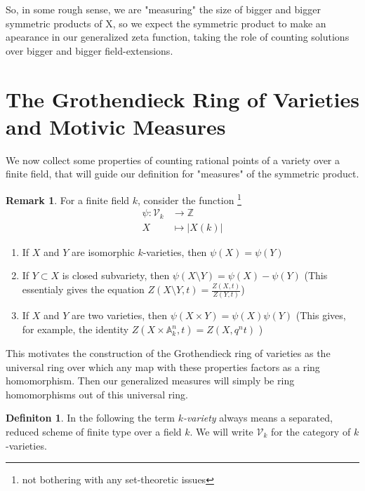 \documentclass[11pt, a4paper, german]{article}
\theoremstyle{plain}
\theoremstyle{definition}
\newtheorem{definition}[theorem]{Definiton}
\newtheorem{remark}[theorem]{Remark}
\begin{document}
So, in some rough sense, we are "measuring" the size of bigger and bigger symmetric products of X, so we expect the symmetric product
to make an apearance in our generalized zeta function, taking the role of counting solutions over bigger and bigger field-extensions.


\section{The Grothendieck Ring of Varieties and Motivic Measures}

We now collect some properties of counting rational points of a variety over a finite field, that will guide our definition for "measures" 
of the symmetric product.

\begin{remark}
    For a finite field $k$, consider the function \footnote{not bothering with any set-theoretic issues} 
    \begin{align*}
        \psi: \mathcal{V}_k & \to   \mathbb{Z}\\
        X & \mapsto |X(k)|
    \end{align*}
    \begin{enumerate}
        \item If $X$ and $Y$ are isomorphic $k$-varieties, then $\psi(X) = \psi(Y)$
        \item If $Y \subset X$ is closed subvariety, then $\psi(X \setminus Y) = \psi(X) - \psi(Y)$ 
              (This essentialy gives the equation $Z(X \setminus Y, t) = \frac{Z(X, t)}{Z(Y,t)}$)
        \item If $X$ and $Y$ are two varieties, then $\psi(X \times Y) = \psi(X)\psi(Y)$
              (This gives, for example, the identity $Z(X \times \mathbb{A}^n_k, t) = Z(X, q^nt)$ )
    \end{enumerate}
\end{remark}


This motivates the construction of the Grothendieck ring of varieties as the universal ring over which any map with these properties factors as a 
ring homomorphism. Then our generalized measures will simply be ring homomorphisms out of this universal ring.

\begin{definition}
    In the following the term \emph{$k$-variety} always means a separated, reduced scheme of finite type over a field $k$.
    We will write $\mathcal{V}_k$ for the category of $k$-varieties.
\end{definition}
\end{document}
